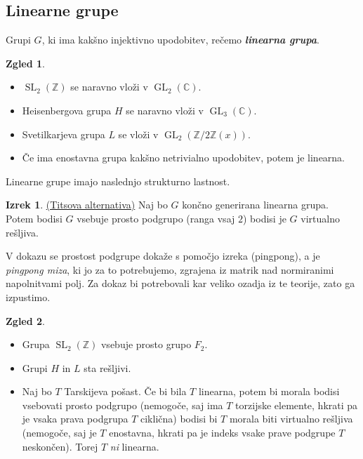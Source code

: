 \documentclass[11pt]{book}
\def\ZZ{\mathbb{Z}}
\def\CC{\mathbb{C}}
\DeclareMathOperator\GL{GL}
\DeclareMathOperator\SL{SL}
\def\definicija{\color{rdeca}\bf\em}
\theoremstyle{definition}
\theoremstyle{zgled}
\newtheorem*{zgled}{Zgled}
\theoremstyle{odprtproblem}
\theoremstyle{domacanaloga}
\theoremstyle{izrek}
\newtheorem*{izrek}{Izrek}
\begin{document}
\subsection{Linearne grupe}

Grupi $G$, ki ima kakšno injektivno upodobitev, rečemo {\definicija linearna grupa}.

\begin{zgled}
\begin{itemize}
    \item $\SL_2(\ZZ)$ se naravno vloži v $\GL_2(\CC)$.
    \item Heisenbergova grupa $H$ se naravno vloži v $\GL_3(\CC)$.
    \item Svetilkarjeva grupa $L$ se vloži v $\GL_2(\ZZ/2\ZZ(x))$.
    \item Če ima enostavna grupa kakšno netrivialno upodobitev, potem je linearna.
\end{itemize}
\end{zgled}

Linearne grupe imajo naslednjo strukturno lastnost.

\begin{izrek}\href{https://people.math.carleton.ca/~jdixon/Titsalt.pdf}{\sc (Titsova alternativa)}
Naj bo $G$ končno generirana linearna grupa. Potem bodisi $G$ vsebuje prosto podgrupo (ranga vsaj $2$) bodisi je $G$ virtualno rešljiva.
\end{izrek}

V dokazu se prostost podgrupe dokaže s pomočjo izreka {\sc (pingpong)}, a je {\em pingpong miza}, ki jo za to potrebujemo, zgrajena iz matrik nad normiranimi napolnitvami polj. Za dokaz bi potrebovali kar veliko ozadja iz te teorije, zato ga izpustimo.

\begin{zgled}
\begin{itemize}
    \item Grupa $\SL_2(\ZZ)$ vsebuje prosto grupo $F_2$.
    \item Grupi $H$ in $L$ sta rešljivi.
    \item Naj bo $T$ Tarskijeva pošast. Če bi bila $T$ linearna, potem bi morala bodisi vsebovati prosto podgrupo (nemogoče, saj ima $T$ torzijske elemente, hkrati pa je vsaka prava podgrupa $T$ ciklična) bodisi bi $T$ morala biti virtualno rešljiva (nemogoče, saj je $T$ enostavna, hkrati pa je indeks vsake prave podgrupe $T$ neskončen). Torej $T$ {\em ni} linearna.
\end{itemize}
\end{zgled}
\end{document}
